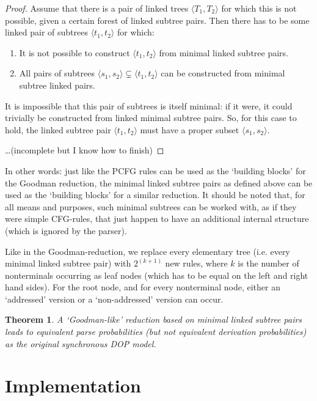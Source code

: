 \documentclass[a4paper]{article}
\newtheorem{theorem}{Theorem}[section]
\theoremstyle{definition}
\begin{document}
\begin{proof}
Assume that there is a pair of linked trees $\langle T_1, T_2 \rangle$ for which this is not possible, given a certain forest of linked subtree pairs. Then there has to be some linked pair of subtrees $\langle t_1, t_2 \rangle$ for which:
\begin{enumerate}
\item It is not possible to construct $\langle t_1, t_2 \rangle$ from minimal linked subtree pairs.
\item All pairs of subtrees $\langle s_1, s_2 \rangle \subsetneq \langle t_1, t_2 \rangle$ can be constructed from minimal subtree linked pairs.
\end{enumerate}
It is impossible that this pair of subtrees is itself minimal: if it were, it could trivially be constructed from linked minimal subtree pairs. So, for this case to hold, the linked subtree pair $\langle t_1, t_2 \rangle$ must have a proper subset $\langle s_1, s_2 \rangle$.

\ldots (incomplete but I know how to finish)
\end{proof}

In other words: just like the PCFG rules can be used as the `building blocks' for the Goodman reduction, the minimal linked subtree pairs as defined above can be used as the `building blocks' for a similar reduction. It should be noted that, for all means and purposes, such minimal subtrees can be worked with, as if they were simple CFG-rules, that just happen to have an additional internal structure (which is ignored by the parser).

Like in the Goodman-reduction, we replace every elementary tree (i.e. every minimal linked subtree pair) with $2^{(k+1)}$ new rules, where $k$ is the number of nonterminals occurring as leaf nodes (which has to be equal on the left and right hand sides). For the root node, and for every nonterminal node, either an `addressed' version or a `non-addressed' version can occur.

\begin{theorem}
A `Goodman-like' reduction based on minimal linked subtree pairs leads to equivalent parse probabilities (but not equivalent derivation probabilities) as the original synchronous DOP model.
\end{theorem}

\section{Implementation}
\end{document}
